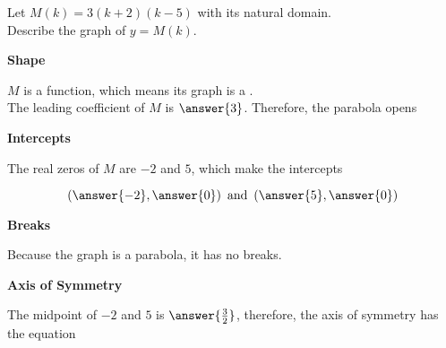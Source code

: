 \documentclass{ximera}
\author{Lee Wayand}
\begin{document}
\begin{exercise} 




Let $M(k) = 3(k+2)(k-5)$ with its natural domain. \\


Describe the graph of $y = M(k)$.






\begin{question}  \textbf{\textcolor{blue!55!black}{Shape}}


$M$ is a  function, which means its graph is a . \\

The leading coefficient of $M$ is $\answer{3}$. Therefore, the parabola opens 



\end{question}








\begin{question}  \textbf{\textcolor{blue!55!black}{Intercepts}}


The real zeros of $M$ are $-2$ and $5$, which make the intercepts

\[
(\answer{-2}, \answer{0}) \, \text{ and } \, (\answer{5}, \answer{0})
\]

\end{question}







\begin{question}  \textbf{\textcolor{blue!55!black}{Breaks}}


Because the graph is a parabola, it has no breaks.

\end{question}







\begin{question}  \textbf{\textcolor{blue!55!black}{Axis of Symmetry}}


The midpoint of $-2$ and $5$ is $\answer{\frac{3}{2}}$, therefore, the axis of symmetry has the equation


\end{question}
\end{exercise}
\end{document}
